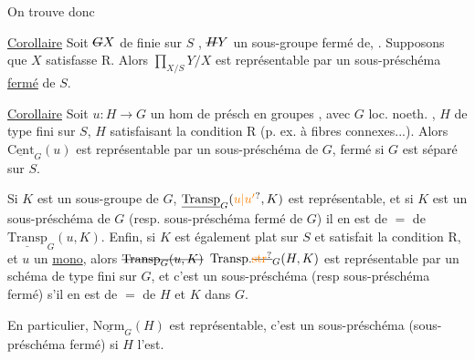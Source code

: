 On trouve donc

\uline{Corollaire} Soit $\deleted{G}X$ de  finie sur $S$ , $\deleted{H}Y$ un sous-groupe fermé de, . Supposons que $X$ satisfasse R. Alors $\displaystyle\prod_{X/S}Y/X$ est représentable par un sous-préschéma \uline{fermé} de $S$.




\uline{Corollaire} Soit $u:H\to G$ un hom de présch en groupes , avec $G$ loc. noeth. , $H$ de type fini sur $S$,  $H$  satisfaisant la condition R (p. ex. à fibres connexes...).  Alors $\underline{\mathrm{Cent}}_G(u)$ est représentable par un sous-préschéma  de $G$,  fermé si $G$ est séparé sur $S$.

Si $K$ est un sous-groupe de $G$,   $\underline{\mathrm{Transp}}_G(\unsure{u|u'},K)$ est représentable, et si $K$ est un sous-préschéma de $G$ (resp. sous-préschéma fermé de $G$) il en est de $=$ de $\underline{\mathrm{Transp}}_G(u,K)$. Enfin, si  $K$ est également plat  sur $S$ et satisfait la condition R,  et $u$ un \uline{mono}, alors $\deleted{\mathrm{Transp}_G(u,K)}$ $\mathrm{Transp}.\deleted{\unsure{\mathrm{str}}}_G(H,K)$ est représentable par un  schéma de type fini sur $G$, et c'est un sous-préschéma (resp sous-préschéma fermé) s'il en est de $=$ de $H$ et $K$ dans $G$.

En particulier, $\underline{\mathrm{Norm}}_G(H)$ est représentable, c'est un sous-préschéma (sous-préschéma fermé)  si $H$ l'est. 

